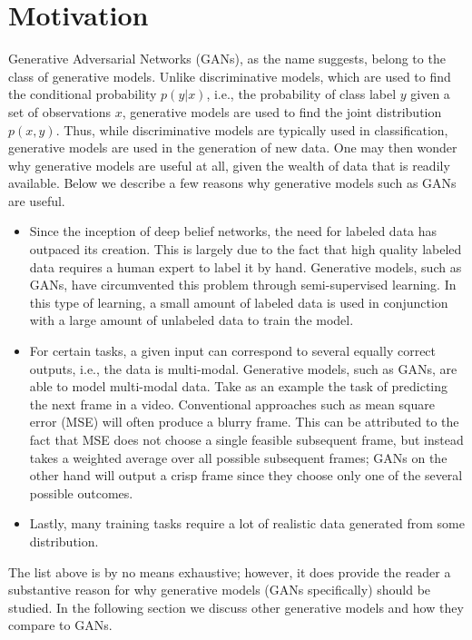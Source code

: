 \section{Motivation}

Generative Adversarial Networks (GANs), as the name suggests, belong to the class of generative models. Unlike discriminative models, which are used to find the conditional probability $p(y|x)$,  i.e., the probability of class label $y$ given a set of observations $x$,  generative models are used to find the joint distribution $p(x,y)$. Thus, while discriminative models are typically used in classification, generative models are used in the generation of new data. One may then wonder why generative models are useful at all, given the wealth of data that is readily available. Below we describe a few reasons why generative models such as GANs are useful.

\begin{itemize}
  \item Since the inception of deep belief networks, the need for labeled data has outpaced its creation. This is largely due to the fact that high quality labeled data requires a human expert to label it by hand. Generative models, such as GANs, have circumvented this problem through semi-supervised learning. In this type of learning, a small amount of labeled data is used in conjunction with a large amount of unlabeled data to train the model.
  \item For certain tasks, a given input can correspond to several equally correct outputs, i.e., the data is multi-modal. Generative models, such as GANs, are able to model multi-modal data. Take as an example the task of predicting the next frame in a video. Conventional approaches such as mean square error (MSE) will often produce a blurry frame. This can be attributed to the fact that MSE does not choose a single feasible subsequent frame, but instead takes a weighted average over all possible subsequent frames; GANs on the other hand will output a crisp frame since they choose only one of the several possible outcomes. \cite{lotter2015unsupervised}
  \item Lastly, many training tasks require a lot of realistic data generated from some distribution. \cite{goodfellow2016nips}

\end{itemize}

  The list above is by no means exhaustive; however, it does provide the reader a substantive reason for why generative models (GANs specifically) should be studied. In the following section we discuss other generative models and how they compare to GANs.
